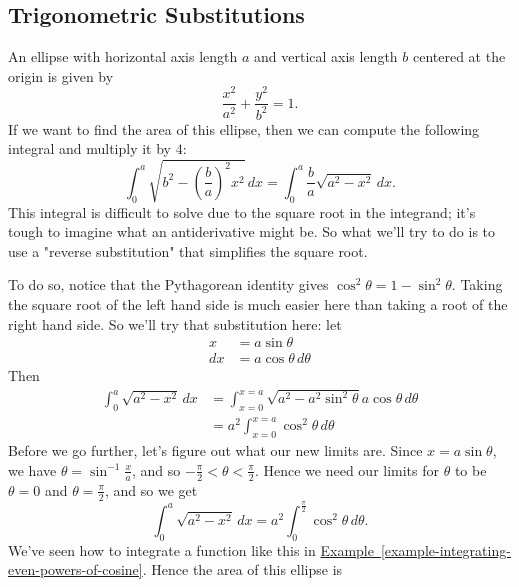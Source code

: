 \documentclass[10pt,]{book}
\theoremstyle{ptxplainnotitle}
\theoremstyle{ptxplaintitle}
\theoremstyle{ptxplainnotitle}
\theoremstyle{ptxplaintitle}
\theoremstyle{ptxplainnotitle}
\theoremstyle{ptxplaintitle}
\theoremstyle{ptxdefinitionnotitle}
\theoremstyle{ptxdefinitiontitle}
\theoremstyle{ptxdefinitionnotitle}
\theoremstyle{ptxdefinitiontitle}
\theoremstyle{ptxdefinitionnotitle}
\theoremstyle{ptxdefinitiontitle}
\theoremstyle{ptxdefinitionnotitle}
\theoremstyle{ptxdefinitiontitle}
\theoremstyle{ptxdefinitionnotitle}
\theoremstyle{ptxdefinitiontitle}
\numberwithin{equation}{section}
\newcommand{\lt}{<}
\begin{document}
\subsection[{Trigonometric Substitutions}]{Trigonometric Substitutions}\label{subsection-trigonometric-substitutions}
\hypertarget{p-542}{}%
An ellipse with horizontal axis length \(a\) and vertical axis length \(b\) centered at the origin is given by%
\begin{equation*}
\frac{x^{2}}{a^{2}} + \frac{y^{2}}{b^{2}} = 1.
\end{equation*}
If we want to find the area of this ellipse, then we can compute the following integral and multiply it by \(4\):%
\begin{equation*}
\int_{0}^{a}\sqrt{b^{2} - (\frac{b}{a})^{2}x^{2}}\,dx = \int_{0}^{a}\frac{b}{a}\sqrt{a^{2} - x^{2}}\,dx.
\end{equation*}
This integral is difficult to solve due to the square root in the integrand; it's tough to imagine what an antiderivative might be. So what we'll try to do is to use a "reverse substitution" that simplifies the square root.%
\par
\hypertarget{p-543}{}%
To do so, notice that the Pythagorean identity gives \(\cos^{2}\theta = 1 - \sin^{2}\theta\). Taking the square root of the left hand side is much easier here than taking a root of the right hand side. So we'll try that substitution here: let%
\begin{align*}
x & = a\sin\theta \\
dx & = a\cos\theta\,d\theta 
\end{align*}
Then%
\begin{align*}
\int_{0}^{a}\sqrt{a^{2} - x^{2}}\,dx & = \int_{x = 0}^{x = a}\sqrt{a^{2} - a^{2}\sin^{2}\theta}a\cos\theta\,d\theta \\
& = a^{2}\int_{x = 0}^{x = a}\cos^{2}\theta\,d\theta 
\end{align*}
Before we go further, let's figure out what our new limits are. Since \(x = a\sin\theta\), we have \(\theta = \sin^{-1}\frac{x}{a}\), and so \(-\frac{\pi}{2} \lt \theta \lt \frac{\pi}{2}\). Hence we need our limits for \(\theta\) to be \(\theta = 0\) and \(\theta = \frac{\pi}{2}\), and so we get%
\begin{equation*}
\int_{0}^{a}\sqrt{a^{2} - x^{2}}\,dx = a^{2}\int_{0}^{\frac{\pi}{2}}\cos^{2}\theta\,d\theta.
\end{equation*}
We've seen how to integrate a function like this in \hyperref[example-integrating-even-powers-of-cosine]{Example~\ref{example-integrating-even-powers-of-cosine}}. Hence the area of this ellipse is%
\end{document}
